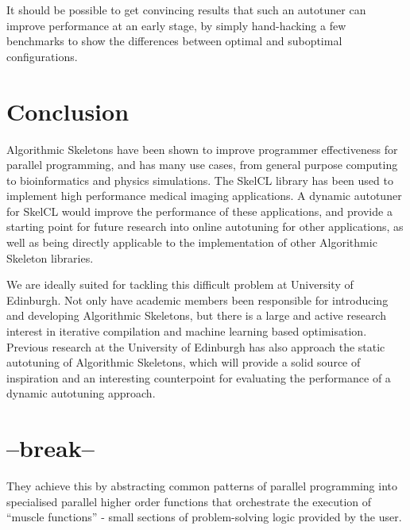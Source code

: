 
It should be possible to get convincing results that such an autotuner
can improve performance at an early stage, by simply hand-hacking a
few benchmarks to show the differences between optimal and suboptimal
configurations.

\section*{Conclusion}

Algorithmic Skeletons have been shown to improve programmer
effectiveness for parallel programming, and has many use cases, from
general purpose computing to bioinformatics and physics
simulations. The SkelCL library has been used to implement high
performance medical imaging applications. A dynamic autotuner for
SkelCL would improve the performance of these applications, and
provide a starting point for future research into online autotuning
for other applications, as well as being directly applicable to the
implementation of other Algorithmic Skeleton libraries.


We are ideally suited for tackling this difficult problem at
University of Edinburgh. Not only have academic members been
responsible for introducing and developing Algorithmic Skeletons, but
there is a large and active research interest in iterative compilation
and machine learning based optimisation. Previous research at the
University of Edinburgh has also approach the static autotuning of
Algorithmic Skeletons, which will provide a solid source of
inspiration and an interesting counterpoint for evaluating the
performance of a dynamic autotuning approach.

\newpage
\section*{--break--}

They achieve this by abstracting common patterns of parallel
programming into specialised parallel higher order functions that
orchestrate the execution of ``muscle functions'' - small sections of
problem-solving logic provided by the user.

